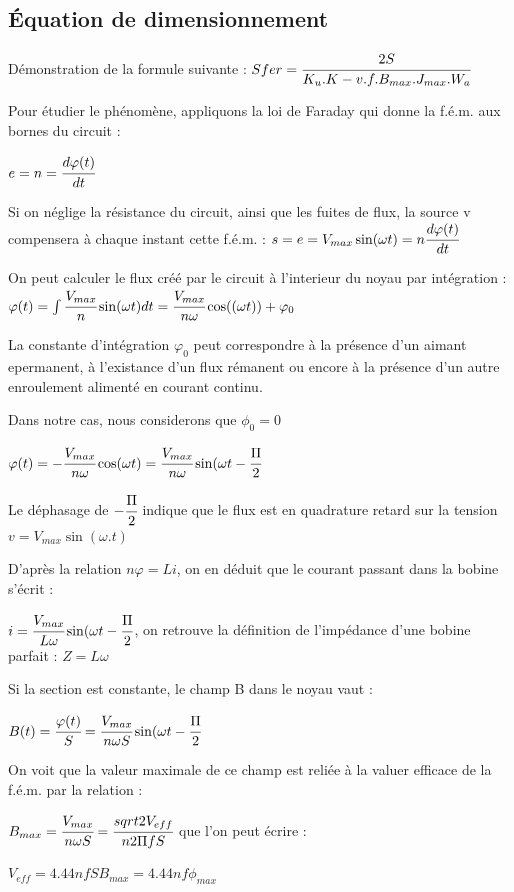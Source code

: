\subsection{Équation de dimensionnement}


Démonstration de la formule suivante : $ Sfer = \cfrac{2S}{K_u.K-v.f.B_{max}.J_{max}.W_a}$

Pour étudier le phénomène, appliquons la loi de Faraday qui donne la f.é.m. aux bornes du circuit : 

$e = n= \cfrac{d\varphi(t)}{dt}$

Si on néglige la résistance du circuit, ainsi que les fuites de flux, la source v compensera à chaque instant cette f.é.m. : 
$s = e = V_{max}\sin(\omega{}t) = n\cfrac{d\varphi(t)}{dt}$

On peut calculer le flux créé par le circuit à l'interieur du noyau par intégration :
$\varphi(t) = \int {\cfrac{V_{max}}{n} \sin(\omega{}t) dt} = \cfrac{V_{max}}{n\omega}\cos((\omega{}t)) + \varphi_0$

La constante d'intégration $\varphi_0$ peut correspondre à la présence d'un aimant epermanent, à l'existance d'un flux rémanent ou encore à la présence d'un autre enroulement alimenté en courant continu. 

Dans notre cas, nous considerons que $\phi_0 = 0$

$\varphi(t) = - \cfrac{V_{max}}{n\omega} \cos(\omega{}t) = \cfrac{V_{max}}{n\omega} \sin(\omega{}t - \cfrac{\Pi}{2}$

Le déphasage de $- \cfrac{\Pi}{2}$ indique que le flux est en quadrature retard sur la tension $v =  V_{max}\sin(\omega.t)$

D'après la relation $n\varphi = Li$, on en déduit que le courant passant dans la bobine s'écrit : 

$i = \cfrac{V_{max}}{L\omega} \sin(\omega{}t - \cfrac{\Pi}{2}$, on retrouve la définition de l'impédance d'une bobine parfait : $Z = L\omega$

Si la section est constante, le champ B dans le noyau vaut : 

$B(t) =  \cfrac{\varphi(t)}{S} = \cfrac{V_{max}}{n\omega S}\sin(\omega{}t - \cfrac{\Pi}{2}$

On voit que la valeur maximale de ce champ est reliée à la valuer efficace de la f.é.m. par la relation :

$B_{max} =  \cfrac{V_{max}}{n\omega S} = \cfrac{sqrt{2}V_{eff}}{n 2\Pi f S}$ que l'on peut écrire : 

$V_{eff} = 4.44 n f S B_{max} = 4.44 n f \phi_{max}$

